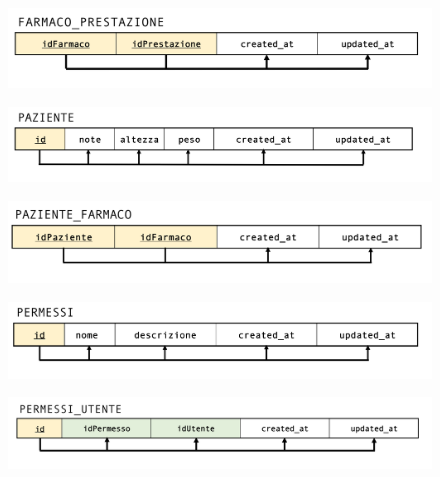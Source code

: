 \documentclass[paper=a4, fontsize=11pt,x11names]{report}
\begin{document}
\begin{figure}[H]
\begin{center}
\includegraphics[scale=0.4]{immagini_normalizzazione/farmaco_prestazione}
\end{center}
\end{figure}

\begin{figure}[H]
\begin{center}
\includegraphics[scale=0.4]{immagini_normalizzazione/paziente}
\end{center}
\end{figure}

\begin{figure}[H]
\begin{center}
\includegraphics[scale=0.4]{immagini_normalizzazione/paziente_farmaco}
\end{center}
\end{figure}

\begin{figure}[H]
\begin{center}
\includegraphics[scale=0.4]{immagini_normalizzazione/permessi}
\end{center}
\end{figure}

\begin{figure}[H]
\begin{center}
\includegraphics[scale=0.4]{immagini_normalizzazione/permessi_utente}
\end{center}
\end{figure}
\end{document}
